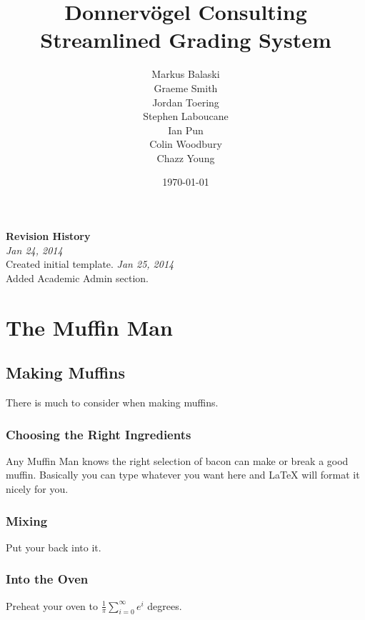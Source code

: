 \documentclass{article}
\begin{document}
\title{Donnervögel Consulting \\ Streamlined Grading System}
\author{Markus Balaski \\ Graeme Smith \\ Jordan Toering \\ Stephen Laboucane \\ Ian Pun \\ Colin Woodbury \\ Chazz Young}
\date{\today}
\maketitle
\clearpage

\textbf{Revision History}\\
\emph{Jan 24, 2014}\\
Created initial template.
\emph{Jan 25, 2014}\\
Added Academic Admin section.
\clearpage

\tableofcontents
\clearpage

\section{The Muffin Man}
\subsection{Making Muffins}
There is much to consider when making muffins.
\subsubsection{Choosing the Right Ingredients}
Any Muffin Man knows the right selection of bacon can make or break a good
muffin. Basically you can type whatever you want here and LaTeX will format it
nicely for you.
\subsubsection{Mixing}
Put your back into it.
\subsubsection{Into the Oven}
Preheat your oven to $\frac{1}{\pi}\sum_{i=0}^{\infty}e^i$ degrees.
\end{document}
